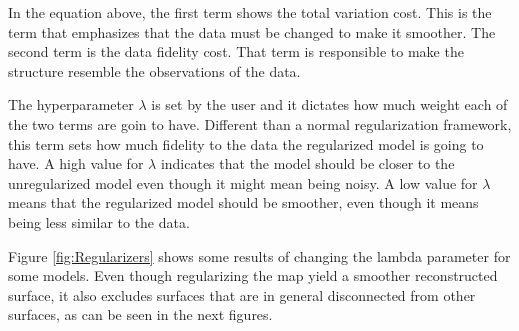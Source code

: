 \documentclass[12pt]{article}
\begin{document}
In the equation above, the first term shows the total variation cost. This is the term that emphasizes that the data must be changed to make it smoother. The second term is the data fidelity cost. That term is responsible to make the structure resemble the observations of the data.

The hyperparameter $\lambda$ is set by the user and it dictates how much weight each of the two terms are goin to have. Different than a normal regularization framework, this term sets how much fidelity to the data the regularized model is going to have. A high value for $\lambda$ indicates that the model should be closer to the unregularized model even though it might mean being noisy. A low value for $\lambda$ means that the regularized model should be smoother, even though it means being less similar to the data.

Figure \ref{fig:Regularizers} shows some results of changing the lambda parameter for some models. Even though regularizing the map yield a smoother reconstructed surface, it also excludes surfaces that are in general disconnected from other surfaces, as can be seen in the next figures.
\end{document}
